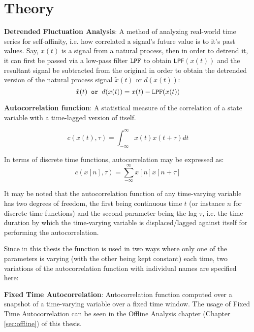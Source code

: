 \section[Theory]{Theory}
\label{sec:theory}

\textbf{Detrended Fluctuation Analysis}: A method of analyzing real-world time series for self-affinity, i.e. how correlated a signal's future value is to it's past values. Say, $x(t)$ is a signal from a natural process, then in order to detrend it, it can first be passed via a low-pass filter $\verb|LPF|$ to obtain \verb|LPF|$(x(t))$ and the resultant signal be subtracted from the original in order to obtain the detrended version of the natural process signal $\tilde{x}(t)$ or $d(x(t))$:
\begin{equation}
	\tilde{x}(t) \verb| or | d(x(t)) = x(t) - \verb|LPF|(x(t))
\end{equation}

\textbf{Autocorrelation function}: A statistical measure of the correlation of a state variable with a time-lagged version of itself. 

\begin{equation}
	c(x(t), \tau) = \int_{-\infty}^{\infty}x(t)x(t+\tau)dt  
\end{equation}

In terms of discrete time functions, autocorrelation may be expressed as:
\begin{equation}
	c(x[n], \tau) =  \sum_{-\infty}^{\infty} x[n]x[n+\tau]
\end{equation}

It may be noted that the autocorrelation function of any time-varying variable has two degrees of freedom, the first being continuous time $t$ (or instance $n$ for discrete time functions) and the second parameter being the lag $\tau$, i.e. the time duration by which the time-varying variable is displaced/lagged against itself for performing the autocorrelation.

Since in this thesis the function is used in two ways where only one of the parameters is varying (with the other being kept constant) each time, two variations of the autocorrelation function with individual names are specified here:

\textbf{Fixed Time Autocorrelation}: Autocorrelation function computed over a snapshot of a time-varying variable over a fixed time window. The usage of Fixed Time Autocorrelation can be seen in the Offline Analysis chapter (Chapter \ref{sec:offline}) of this thesis.

